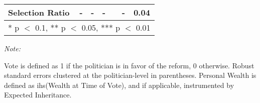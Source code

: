 \begin{table}[!h]
{\begin{threeparttable}
\begin{tabular}[t]{lcccccc}
Selection Ratio & - & - & - &  & - & 0.04\\
\bottomrule
\multicolumn{7}{l}{\rule{0pt}{1em}* p $<$ 0.1, ** p $<$ 0.05, *** p $<$ 0.01}\\
\end{tabular}
\begin{tablenotes}[para]
\item \textit{Note: } 
\item Vote is defined as 1 if the politician is in favor of the reform, 0 otherwise. Robust standard errors clustered at the politician-level in parentheses. Personal Wealth is defined as ihs(Wealth at Time of Vote), and if applicable, instrumented by Expected Inheritance.
\end{tablenotes}
\end{threeparttable}}
\end{table}
